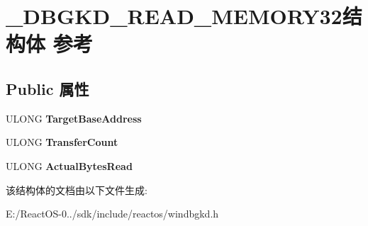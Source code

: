 \hypertarget{struct___d_b_g_k_d___r_e_a_d___m_e_m_o_r_y32}{}\section{\+\_\+\+D\+B\+G\+K\+D\+\_\+\+R\+E\+A\+D\+\_\+\+M\+E\+M\+O\+R\+Y32结构体 参考}
\label{struct___d_b_g_k_d___r_e_a_d___m_e_m_o_r_y32}
\subsection*{Public 属性}
\begin{DoxyCompactItemize}
\item 
\mbox{\label{struct___d_b_g_k_d___r_e_a_d___m_e_m_o_r_y32_a5de924ac7e4cd6d2a9edfe74ad603900}} 
U\+L\+O\+NG {\bfseries Target\+Base\+Address}
\item 
\mbox{\label{struct___d_b_g_k_d___r_e_a_d___m_e_m_o_r_y32_a45c7e5d58f0147fd37a4adfdc28378ab}} 
U\+L\+O\+NG {\bfseries Transfer\+Count}
\item 
\mbox{\label{struct___d_b_g_k_d___r_e_a_d___m_e_m_o_r_y32_a186dea3a8af0891b430fd02796073021}} 
U\+L\+O\+NG {\bfseries Actual\+Bytes\+Read}
\end{DoxyCompactItemize}


该结构体的文档由以下文件生成\+:\begin{DoxyCompactItemize}
\item 
E\+:/\+React\+O\+S-\/0../sdk/include/reactos/windbgkd.\+h\end{DoxyCompactItemize}
